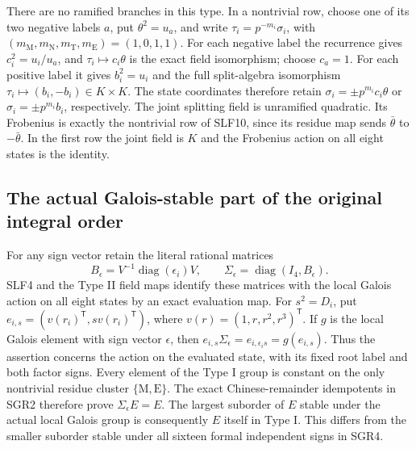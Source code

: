 \documentclass[11pt]{article}
\begin{document}
There are no ramified branches in this type. In a nontrivial row,
choose one of its two negative labels $a$, put $\theta^2=u_a$, and
write $\tau_i=p^{-m_i}\sigma_i$, with
$(m_{\mathrm M},m_{\mathrm N},m_{\mathrm T},m_{\mathrm E})=(1,0,1,1)$.
For each negative label the recurrence gives
$c_i^2=u_i/u_a$, and $\tau_i\mapsto c_i\theta$ is the exact
field isomorphism; choose $c_a=1$. For each positive label it gives
$b_i^2=u_i$ and the full split-algebra isomorphism
$\tau_i\mapsto(b_i,-b_i)\in K\times K$.
The state coordinates therefore retain
$\sigma_i=\pm p^{m_i}c_i\theta$ or
$\sigma_i=\pm p^{m_i}b_i$, respectively. The joint splitting field
is unramified quadratic. Its Frobenius is exactly the nontrivial
row of SLF10, since its residue map sends $\bar\theta$ to
$-\bar\theta$. In the first row the joint field is $K$ and the
Frobenius action on all eight states is the identity.

\subsection{The actual Galois-stable part of the original integral order}
For any sign vector retain the literal rational matrices
\[
 B_\epsilon=V^{-1}\operatorname{diag}(\epsilon_i)V,
 \qquad\Sigma_\epsilon=\operatorname{diag}(I_4,B_\epsilon).
                                                               \tag{SLF11}
\]
SLF4 and the Type II field maps identify these matrices with the
local Galois action on all eight states by an exact evaluation map.
For $s^2=D_i$, put
$e_{i,s}=(v(r_i)^{\mathsf T},s v(r_i)^{\mathsf T})$, where
$v(r)=(1,r,r^2,r^3)^{\mathsf T}$. If $g$ is the local Galois
element with sign vector $\epsilon$, then
$e_{i,s}\Sigma_\epsilon=e_{i,\epsilon_i s}=g(e_{i,s})$.
Thus the assertion concerns the action on the evaluated state,
with its fixed root label and both factor signs. Every element of the Type I group is
constant on the only nontrivial residue cluster $\{\mathrm M,\mathrm E\}$.
The exact Chinese-remainder idempotents in SGR2 therefore prove
$\Sigma_\epsilon E=E$. The largest suborder of $E$ stable under
the actual local Galois group is consequently $E$ itself in Type I.
This differs from the smaller suborder stable under all sixteen
formal independent signs in SGR4.
\end{document}
